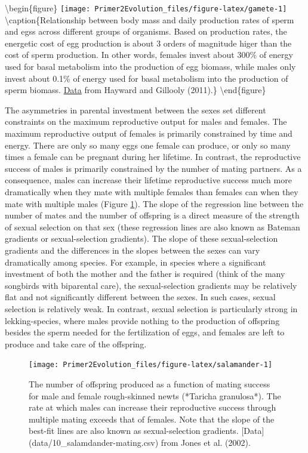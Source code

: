 \documentclass[
]{book}
\begin{document}
\textbackslash begin\{figure\}
\texttt{[image: Primer2Evolution\_files/figure-latex/gamete-1]} \textbackslash caption\{Relationship between body mass and daily production rates of sperm and egss across different groups of organisms. Based on production rates, the energetic cost of egg production is about 3 orders of magnitude higer than the cost of sperm production. In other words, females invest about 300\% of energy used for basal metabolism into the production of egg biomass, while males only invest about 0.1\% of energy used for basal metabolism into the production of sperm biomass. \href{data/10_gamete-production.csv}{Data} from Hayward and Gillooly (2011).\}\label{fig:gamete}
\textbackslash end\{figure\}

The asymmetries in parental investment between the sexes set different constraints on the maximum reproductive output for males and females. The maximum reproductive output of females is primarily constrained by time and energy. There are only so many eggs one female can produce, or only so many times a female can be pregnant during her lifetime. In contrast, the reproductive success of males is primarily constrained by the number of mating partners. As a consequence, males can increase their lifetime reproductive success much more dramatically when they mate with multiple females than females can when they mate with multiple males (Figure \ref{fig:salamander}). The slope of the regression line between the number of mates and the number of offspring is a direct measure of the strength of sexual selection on that sex (these regression lines are also known as Bateman gradients or sexual-selection gradients). The slope of these sexual-selection gradients and the differences in the slopes between the sexes can vary dramatically among species. For example, in species where a significant investment of both the mother and the father is required (think of the many songbirds with biparental care), the sexual-selection gradients may be relatively flat and not significantly different between the sexes. In such cases, sexual selection is relatively weak. In contrast, sexual selection is particularly strong in lekking-species, where males provide nothing to the production of offspring besides the sperm needed for the fertilization of eggs, and females are left to produce and take care of the offspring.

\begin{figure}
\texttt{[image: Primer2Evolution\_files/figure-latex/salamander-1]} \caption{ The number of offspring produced as a function of mating success for male and female rough-skinned newts (*Taricha granulosa*). The rate at which males can increase their reproductive success through multiple mating exceeds that of females. Note that the slope of the best-fit lines are also known as sexual-selection gradients. [Data](data/10_salamdander-mating.csv) from Jones et al. (2002).}\label{fig:salamander}
\end{figure}
\end{document}
